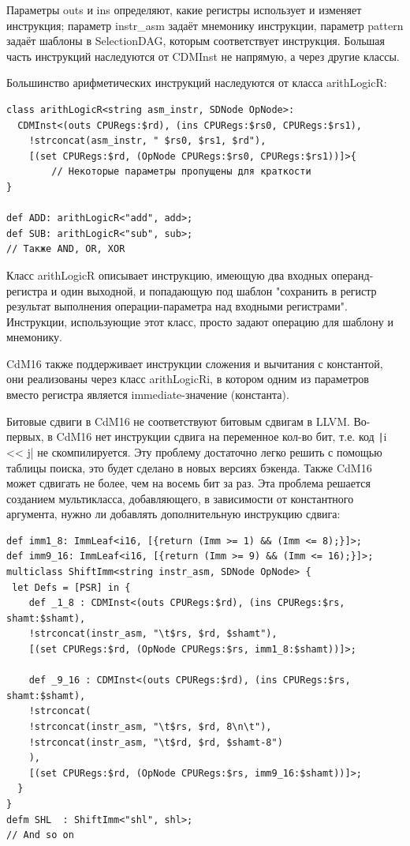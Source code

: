 \documentclass[a4paper,14pt]{extarticle}
\begin{document}
Параметры outs и ins определяют, какие регистры использует и изменяет инструкция; параметр instr\_asm задаёт мнемонику инструкции, параметр pattern задаёт шаблоны в SelectionDAG, которым соответствует инструкция. Большая часть инструкций наследуются от CDMInst не напрямую, а через другие классы.

Большинство арифметических инструкций наследуются от класса arithLogicR:
\begin{verbatim}
class arithLogicR<string asm_instr, SDNode OpNode>:
  CDMInst<(outs CPURegs:$rd), (ins CPURegs:$rs0, CPURegs:$rs1),
    !strconcat(asm_instr, " $rs0, $rs1, $rd"),
    [(set CPURegs:$rd, (OpNode CPURegs:$rs0, CPURegs:$rs1))]>{
		// Некоторые параметры пропущены для краткости
}

def ADD: arithLogicR<"add", add>;
def SUB: arithLogicR<"sub", sub>;
// Также AND, OR, XOR
\end{verbatim}

Класс arithLogicR описывает инструкцию, имеющую два входных операнд-регистра и один выходной, и попадающую под шаблон "сохранить в регистр результат выполнения операции-параметра над входными регистрами". Инструкции, использующие этот класс, просто задают операцию для шаблону и мнемонику.

CdM16 также поддерживает инструкции сложения и вычитания с константой, они реализованы через класс arithLogicRi, в котором одним из параметров вместо регистра является immediate-значение (константа).

Битовые сдвиги в CdM16 не соответствуют битовым сдвигам в LLVM. Во-первых, в CdM16 нет инструкции сдвига на переменное кол-во бит, т.е. код \texttt|i << j| не скомпилируется. Эту проблему достаточно легко решить с помощью таблицы поиска, это будет сделано в новых версиях бэкенда. Также CdM16 может сдвигать не более, чем на восемь бит за раз. Эта проблема решается созданием мультикласса, добавляющего, в зависимости от константного аргумента, нужно ли добавлять дополнительную инструкцию сдвига:
\begin{verbatim}
def imm1_8: ImmLeaf<i16, [{return (Imm >= 1) && (Imm <= 8);}]>;
def imm9_16: ImmLeaf<i16, [{return (Imm >= 9) && (Imm <= 16);}]>;
multiclass ShiftImm<string instr_asm, SDNode OpNode> {
 let Defs = [PSR] in {
	def _1_8 : CDMInst<(outs CPURegs:$rd), (ins CPURegs:$rs, shamt:$shamt),
	!strconcat(instr_asm, "\t$rs, $rd, $shamt"),
	[(set CPURegs:$rd, (OpNode CPURegs:$rs, imm1_8:$shamt))]>;
	
	def _9_16 : CDMInst<(outs CPURegs:$rd), (ins CPURegs:$rs, shamt:$shamt),
	!strconcat(
	!strconcat(instr_asm, "\t$rs, $rd, 8\n\t"),
	!strconcat(instr_asm, "\t$rd, $rd, $shamt-8")
	),
	[(set CPURegs:$rd, (OpNode CPURegs:$rs, imm9_16:$shamt))]>;
  }
}
defm SHL  : ShiftImm<"shl", shl>;
// And so on
\end{verbatim}
\end{document}
